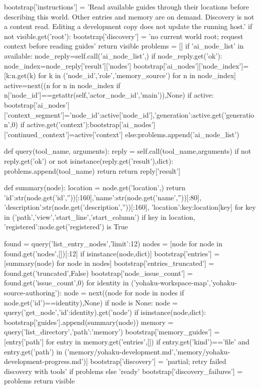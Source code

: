         bootstrap['instructions'] = 'Read available guides through their locations before describing this world. Other entries and memory are on demand. Discovery is not a content read. Editing a development copy does not update the running host.'
        if not visible.get('root'):
            bootstrap['discovery'] = 'no current world root; request context before reading guides'
            return visible
        problems = []
        if 'ai_node_list' in available:
            node_reply=self.call('ai_node_list',{})
            if node_reply.get('ok'):
                node_index=node_reply['result']['nodes']
                bootstrap['ai_nodes']['node_index']=[{k:n.get(k) for k in ('node_id','role','memory_source')} for n in node_index]
                active=next((n for n in node_index if n['node_id']==getattr(self,'actor_node_id','main')),None)
                if active:
                    bootstrap['ai_nodes']['context_segment']={'node_id':active['node_id'],'generation':active.get('generation',0)}
                    if active.get('context'):bootstrap['ai_nodes']['continued_context']=active['context']
            else:problems.append('ai_node_list')

        def query(tool_name, arguments):
            reply = self.call(tool_name,arguments)
            if not reply.get('ok') or not isinstance(reply.get('result'),dict):
                problems.append(tool_name)
                return {}
            return reply['result']

        def summary(node):
            location = node.get('location',{})
            return {'id':str(node.get('id',''))[:160],'name':str(node.get('name',''))[:80],
                    'description':str(node.get('description',''))[:160],
                    'location':{key:location[key] for key in ('path','view','start_line','start_column') if key in location},
                    'registered':node.get('registered') is True}

        found = query('list_entry_nodes',{'limit':12})
        nodes = [node for node in found.get('nodes',[])[:12] if isinstance(node,dict)]
        bootstrap['entries'] = [summary(node) for node in nodes]
        bootstrap['entries_truncated'] = found.get('truncated',False)
        bootstrap['node_issue_count'] = found.get('issue_count',0)
        for identity in ('yohaku-workspace-map','yohaku-source-authoring'):
            node = next((node for node in nodes if node.get('id')==identity),None)
            if node is None:
                node = query('get_node',{'id':identity}).get('node')
            if isinstance(node,dict):
                bootstrap['guides'].append(summary(node))
        memory = query('list_directory',{'path':'memory'})
        bootstrap['memory_guides'] = [entry['path'] for entry in memory.get('entries',[])
                                      if entry.get('kind')=='file' and entry.get('path') in
                                      ('memory/yohaku-development.md','memory/yohaku-development-progress.md')]
        bootstrap['discovery'] = 'partial; retry failed discovery with tools' if problems else 'ready'
        bootstrap['discovery_failures'] = problems
        return visible

